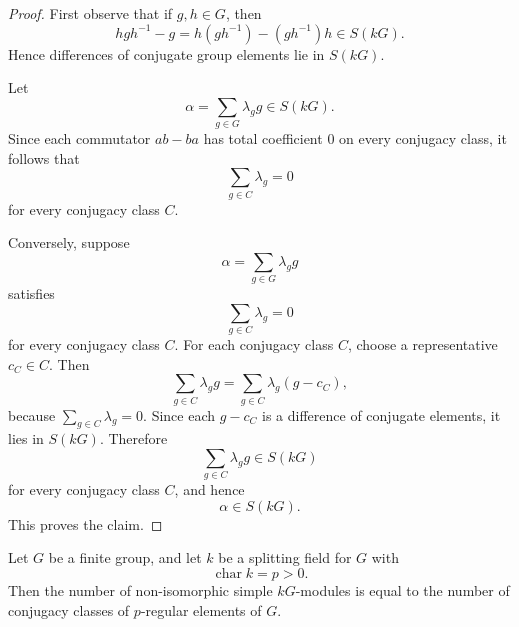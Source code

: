 \begin{proof}
    First observe that if \(g,h\in G\), then
    \[
        hgh^{-1}-g
        =
        h(gh^{-1})-(gh^{-1})h
        \in S(kG).
    \]
    Hence differences of conjugate group elements lie in \(S(kG)\).

    Let
    \[
        \alpha=\sum_{g\in G}\lambda_g g\in S(kG).
    \]
    Since each commutator \(ab-ba\) has total coefficient \(0\) on every conjugacy
    class, it follows that
    \[
        \sum_{g\in C}\lambda_g=0
    \]
    for every conjugacy class \(C\).

    Conversely, suppose
    \[
        \alpha=\sum_{g\in G}\lambda_g g
    \]
    satisfies
    \[
        \sum_{g\in C}\lambda_g=0
    \]
    for every conjugacy class \(C\). For each conjugacy class \(C\), choose a
    representative \(c_C\in C\). Then
    \[
        \sum_{g\in C}\lambda_g g
        =
        \sum_{g\in C}\lambda_g(g-c_C),
    \]
    because \(\sum_{g\in C}\lambda_g=0\). Since each \(g-c_C\) is a difference of
    conjugate elements, it lies in \(S(kG)\). Therefore
    \[
        \sum_{g\in C}\lambda_g g\in S(kG)
    \]
    for every conjugacy class \(C\), and hence
    \[
        \alpha\in S(kG).
    \]
    This proves the claim.
\end{proof}

\begin{theorem}[Brauer]
    Let \(G\) be a finite group, and let \(k\) be a splitting field for \(G\) with
    \[
        \operatorname{char} k=p>0.
    \]
    Then the number of non-isomorphic simple \(kG\)-modules is equal to the number
    of conjugacy classes of \(p\)-regular elements of \(G\).
\end{theorem}

